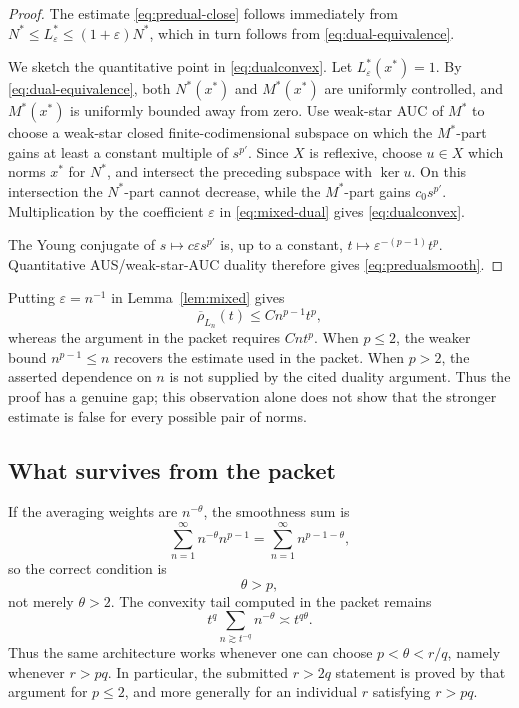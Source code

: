 \documentclass[11pt]{article}
\theoremstyle{definition}
\theoremstyle{remark}
\newcommand{\rhobar}{\overline\rho}
\newcommand{\eps}{\varepsilon}
\begin{document}
\begin{proof}
The estimate \eqref{eq:predual-close} follows immediately from
\(N^*\le L_\eps^*\le(1+\eps)N^*\), which in turn follows from
\eqref{eq:dual-equivalence}.

We sketch the quantitative point in \eqref{eq:dualconvex}.  Let
\(L_\eps^*(x^*)=1\).  By \eqref{eq:dual-equivalence}, both \(N^*(x^*)\) and
\(M^*(x^*)\) are uniformly controlled, and \(M^*(x^*)\) is uniformly bounded
away from zero.  Use weak-star AUC of \(M^*\) to choose a weak-star closed
finite-codimensional subspace on which the \(M^*\)-part gains at least a
constant multiple of \(s^{p'}\).  Since \(X\) is reflexive, choose
\(u\in X\) which norms \(x^*\) for \(N^*\), and intersect the preceding
subspace with \(\ker u\).  On this intersection the \(N^*\)-part cannot
decrease, while the \(M^*\)-part gains \(c_0s^{p'}\).  Multiplication by the
coefficient \(\eps\) in \eqref{eq:mixed-dual} gives
\eqref{eq:dualconvex}.

The Young conjugate of \(s\mapsto c\eps s^{p'}\) is, up to a constant,
\(t\mapsto \eps^{-(p-1)}t^p\).  Quantitative AUS/weak-star-AUC duality
therefore gives \eqref{eq:predualsmooth}.
\end{proof}

Putting \(\eps=n^{-1}\) in Lemma~\ref{lem:mixed} gives
\begin{equation}\label{eq:correct-n}
 \rhobar_{L_n}(t)\le C n^{p-1}t^p,
\end{equation}
whereas the argument in the packet requires \(Cnt^p\).  When \(p\le2\), the weaker bound
\(n^{p-1}\le n\) recovers the estimate used in the packet.  When \(p>2\),
the asserted dependence on \(n\) is not supplied by the cited duality
argument.  Thus the proof has a genuine gap; this observation alone does not
show that the stronger estimate is false for every possible pair of norms.

\subsection{What survives from the packet}

If the averaging weights are \(n^{-\theta}\), the smoothness sum is
\[
 \sum_{n=1}^\infty n^{-\theta}n^{p-1}
 =\sum_{n=1}^\infty n^{p-1-\theta},
\]
so the correct condition is
\begin{equation}\label{eq:theta-smooth}
 \theta>p,
\end{equation}
not merely \(\theta>2\).  The convexity tail computed in the packet remains
\[
 t^q\sum_{n\gtrsim t^{-q}}n^{-\theta}\asymp t^{q\theta}.
\]
Thus the same architecture works whenever one can choose
\(p<\theta<r/q\), namely whenever \(r>pq\).  In particular, the submitted
\(r>2q\) statement is proved by that argument for \(p\le2\), and more
generally for an individual \(r\) satisfying \(r>pq\).
\end{document}
